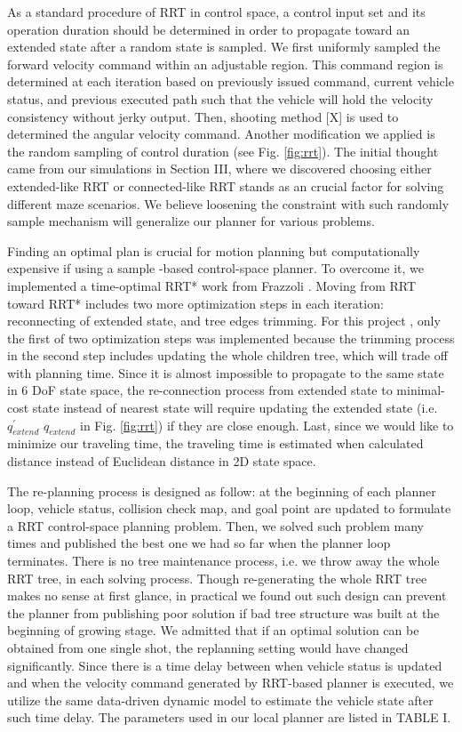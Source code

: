 \documentclass[../thesis.tex]{subfiles}
\begin{document}
As a standard procedure of RRT in control space, a control input set and its operation duration should be determined in order to propagate toward an extended state after a random state is sampled. We first uniformly sampled the forward velocity command within an adjustable region. This command region is determined at each iteration based on previously issued command, current vehicle status, and previous executed path such that the vehicle will hold the velocity consistency without jerky output. Then, shooting method [X]\todo{} is used to determined the angular velocity command. Another modification we applied is the random sampling of control duration (see Fig. \ref{fig:rrt}). The initial thought came from our simulations in Section III, where we discovered choosing either extended-like RRT or connected-like RRT stands as an crucial factor for solving different maze scenarios. We believe loosening the constraint with such randomly sample mechanism will generalize our planner for various problems. %

Finding an optimal plan is crucial for motion planning but computationally expensive if using a sample -based control-space planner. To overcome it, we implemented a time-optimal RRT* work from Frazzoli \cite{}. Moving from RRT toward RRT* includes two more optimization steps in each iteration: reconnecting of extended state, and tree edges trimming. For this project , only the first of two optimization steps was implemented because the trimming process in the second step includes updating the whole children tree, which will trade off with planning time. Since it is almost impossible to propagate to the same state in 6 DoF state space, the re-connection process from extended state to minimal-cost state instead of nearest state will require updating the extended state (i.e.  $q^{'}_{extend}$ $q_{extend}$ in Fig. \ref{fig:rrt}) if they are close enough. Last, since we would like to minimize our traveling time, the traveling time is estimated when calculated distance instead of Euclidean distance in 2D state space. 

The re-planning process is designed as follow: at the beginning of each planner loop, vehicle status, collision check map, and goal point are updated to formulate a RRT control-space planning problem. Then, we solved such problem many times and published the best one we had so far when the planner loop terminates. There is no tree maintenance process, i.e. we throw away the whole RRT tree, in each solving process. Though re-generating the whole RRT tree makes no sense at first glance, in practical we found out such design  can prevent the planner from publishing poor solution if bad tree structure was built at the beginning of growing stage. We admitted that if an optimal solution can be obtained from one single shot, the replanning setting would have changed significantly. Since there is a time delay between when vehicle status is updated and when the velocity command generated by RRT-based planner is executed, we utilize the same data-driven dynamic model to estimate the vehicle state after such time delay. The parameters used in our local planner are listed in TABLE I. 
\end{document}
